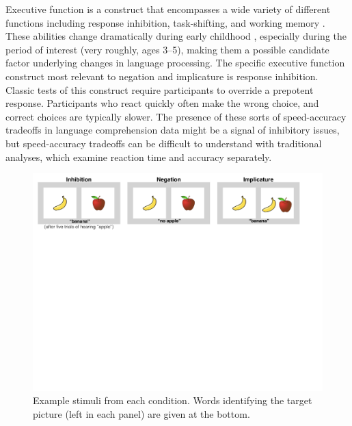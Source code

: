 \documentclass[10pt,letterpaper]{article}
\begin{document}
Executive function is a construct that encompasses a wide variety of different functions including response inhibition, task-shifting, and working memory \cite{miyake2000}. These abilities change dramatically during early childhood \cite{diamond1996,davidson2006}, especially during the period of interest (very roughly, ages 3--5), making them a possible candidate factor underlying changes in language processing. The specific executive function construct most relevant to negation and implicature is response inhibition. Classic tests of this construct require participants to override a prepotent response. Participants who react quickly often make the wrong choice, and correct choices are typically slower. The presence of these sorts of speed-accuracy tradeoffs in language comprehension data might be a signal of inhibitory issues, but speed-accuracy tradeoffs can be difficult to understand with traditional analyses, which examine reaction time and accuracy separately.


\begin{figure}[t!]
\begin{centering}
\includegraphics[width=.9\textwidth]{figures/stimuli.pdf}
\caption{\label{fig:stimuli} Example stimuli from each condition. Words identifying the target picture (left in each panel) are given at the bottom.}
\end{centering}
\end{figure}
\end{document}
